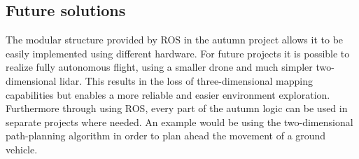 \subsection{Future solutions}
The modular structure provided by ROS in the autumn project allows it to be easily implemented using different hardware. For future projects it is possible to realize fully autonomous flight, using a smaller drone and much simpler two-dimensional lidar. This results in the loss of three-dimensional mapping capabilities but enables a more reliable and easier environment exploration.\newline 
Furthermore through using ROS, every part of the autumn logic can be used in separate projects where needed.
An example would be using the two-dimensional path-planning algorithm in order to plan ahead the movement of a ground vehicle. 

\filbreak